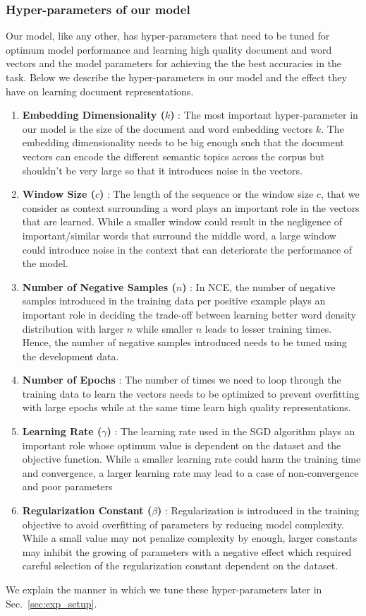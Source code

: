 \subsubsection{Hyper-parameters of our model}
\label{sec:hp_doc}
Our model, like any other, has hyper-parameters that need to be tuned for optimum model performance and learning high quality document and word vectors and the model parameters for achieving the the best accuracies in the task. Below we describe the hyper-parameters in our model and the effect they have on learning document representations.
\begin{enumerate}
\item \textbf{Embedding Dimensionality ($k$)} : The most important hyper-parameter in our model is the size of the document and word embedding vectors $k$. The embedding dimensionality needs to be big enough such that the document vectors can encode the different semantic topics across the corpus but shouldn't be very large so that it introduces noise in the vectors.

\item \textbf{Window  Size ($c$)} : The length of the sequence or the window size $c$, that we consider as context surrounding a word plays an important role in the vectors that are learned. While a smaller window could result in the negligence of important/similar words that surround the middle word, a large window could introduce noise in the context that can deteriorate the performance of the model.

\item \textbf{Number of Negative Samples ($n$)} : In NCE, the number of negative samples introduced in the training data per positive example plays an important role in deciding the trade-off between learning better word density distribution with larger $n$ while smaller $n$ leads to lesser training times. Hence, the number of negative samples introduced needs to be tuned using the development data.

\item \textbf{Number of Epochs} : The number of times we need to loop through the training data to learn the vectors needs to be optimized to prevent overfitting with large epochs while at the same time learn high quality representations.

\item \textbf{Learning Rate ($\gamma$)} : The learning rate used in the SGD algorithm plays an important role whose optimum value is dependent on the dataset and the objective function. While a smaller learning rate could harm the training time and convergence, a larger learning rate may lead to a case of non-convergence and poor parameters

\item \textbf{Regularization Constant ($\beta$)} : Regularization is introduced in the training objective to avoid overfitting of parameters by reducing model complexity. While a small value may not penalize complexity by enough, larger constants may inhibit the growing of parameters with a negative effect which required careful selection of the regularization constant dependent on the dataset.
\end{enumerate}
We explain the manner in which we tune these hyper-parameters later in Sec.~\ref{sec:exp_setup}.




